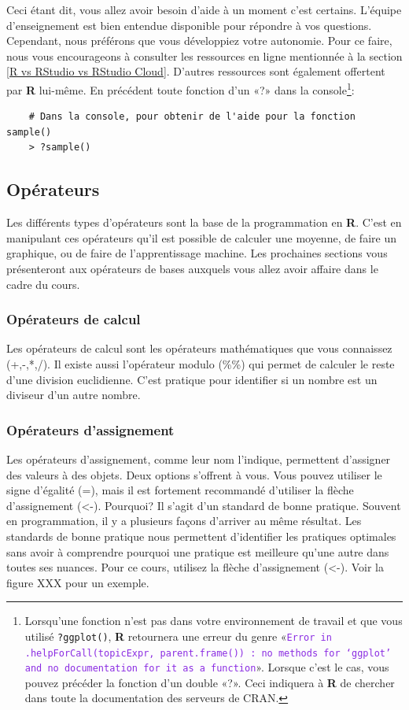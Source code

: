 \documentclass[10.5pt,a4paper]{article}
\begin{document}
Ceci étant dit, vous allez avoir besoin d'aide à un moment c'est certains. L'équipe d'enseignement est bien entendue disponible pour répondre à vos questions. Cependant, nous préférons que vous développiez votre autonomie. Pour ce faire, nous vous encourageons à consulter les ressources en ligne mentionnée à la section \ref{R vs RStudio vs RStudio Cloud}. D'autres ressources sont également offertent par \textbf{R} lui-même. En précédent toute fonction d'un «?» dans la console\footnote{Lorsqu'une fonction n'est pas dans votre environnement de travail et que vous utilisé \texttt{?ggplot()}, \textbf{R} retournera une erreur du genre «\textcolor{BlueViolet}{\texttt{Error in .helpForCall(topicExpr, parent.frame()) : no methods for ‘ggplot’ and no documentation for it as a function}}». Lorsque c'est le cas, vous pouvez précéder la fonction d'un double «?». Ceci indiquera à \textbf{R} de chercher dans toute la documentation des serveurs de CRAN.}:

  \begin{lstlisting}
    # Dans la console, pour obtenir de l'aide pour la fonction sample()
    > ?sample()
  \end{lstlisting}
  
  \subsection{Opérateurs}
  Les différents types d'opérateurs sont la base de la programmation en \textbf{R}. C'est en manipulant ces opérateurs qu'il est possible de calculer une moyenne, de faire un graphique, ou de faire de l'apprentissage machine. Les prochaines sections vous présenteront aux opérateurs de bases auxquels vous allez avoir affaire dans le cadre du cours. 
  
    \subsubsection{Opérateurs de calcul}
    Les opérateurs de calcul sont les opérateurs mathématiques que vous connaissez (+,-,*,/). Il existe aussi l'opérateur modulo (\%\%) qui permet de calculer le reste d'une division euclidienne. C'est pratique pour identifier si un nombre est un diviseur d'un autre nombre.  

      
    \subsubsection{Opérateurs d'assignement}
    Les opérateurs d'assignement, comme leur nom l'indique, permettent d'assigner des valeurs à des objets. Deux options s'offrent à vous. Vous pouvez utiliser le signe d'égalité (=), mais il est fortement recommandé d'utiliser la flèche d'assignement (<-). Pourquoi? Il s'agit d'un standard de bonne pratique. Souvent en programmation, il y a plusieurs façons d'arriver au même résultat. Les standards de bonne pratique nous permettent d'identifier les pratiques optimales sans avoir à comprendre pourquoi une pratique est meilleure qu'une autre dans toutes ses nuances. Pour ce cours, utilisez la flèche d'assignement (<-). Voir la figure XXX pour un exemple.
\end{document}
